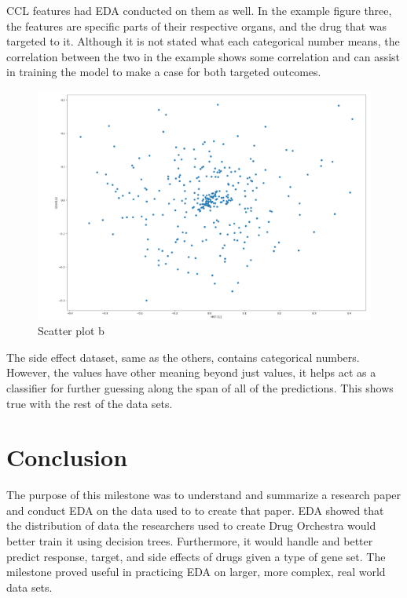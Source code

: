 \documentclass{article}
\begin{document}
CCL features had EDA conducted on them as well. In the example figure three, the features are specific parts of their respective organs, and the drug that was targeted to it. Although it is not stated what each categorical number means, the correlation between the two in the example shows some correlation and can assist in training the model to make a case for both targeted outcomes. 
\begin{figure}
    \centering
    \includegraphics[width=0.5\linewidth]{c.png}
    \caption{Scatter plot b}
    \label{fig:enter-label}
\end{figure}
The side effect dataset, same as the others, contains categorical numbers. However, the values have other meaning beyond just values, it helps act as a classifier for further guessing along the span of all of the predictions. This shows true with the rest of the data sets.
\section{Conclusion}
The purpose of this milestone was to understand and summarize a research paper and conduct EDA on the data used to to create that paper. EDA showed that the distribution of data the researchers used to create Drug Orchestra would better train it using decision trees. Furthermore, it would handle and better predict response, target, and side effects of drugs given a type of gene set. The milestone proved useful in practicing EDA on larger, more complex, real world data sets.
\end{document}

